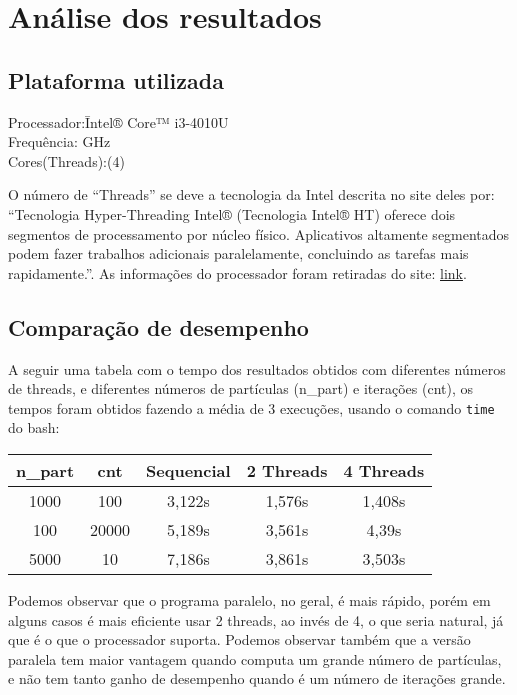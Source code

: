 \documentclass[a4paper, 12pt]{article}
\begin{document}

\section{Análise dos resultados}
\subsection{Plataforma utilizada}

\begin{tabbing}
    Processador:\qquad\qquad\=
    Intel® Core™ i3-4010U\\
    Frequência: GHz\\
    Cores(Threads):(4)
\end{tabbing}

O número de ``Threads'' se deve a tecnologia da Intel descrita no site deles
por: ``Tecnologia Hyper-Threading Intel® (Tecnologia Intel® HT) oferece dois
segmentos de processamento por núcleo físico. Aplicativos altamente segmentados
podem fazer trabalhos adicionais paralelamente, concluindo as tarefas mais
rapidamente.''. As informações do processador foram retiradas do site:
\href{http://ark.intel.com/pt-br/products/75107/Intel-Core-i3-4010U-Processor-3M-Cache-1_70-GHz}{link}.


\subsection{Comparação de desempenho}

A seguir uma tabela com o tempo dos resultados obtidos com diferentes números de
threads, e diferentes números de partículas (n\_part) e iterações (cnt), os
tempos foram obtidos fazendo a média de 3 execuções, usando o comando
\verb|time| do bash:
\begin{center}
    \begin{tabular}{ |c|c||c|c|c| }
    \hline
    n\_part & cnt & Sequencial & 2 Threads & 4 Threads \\
    \hline
    1000 & 100 & 3,122s & 1,576s & 1,408s \\
    \hline
    100 & 20000 & 5,189s & 3,561s & 4,39s \\
    \hline
    5000 & 10 & 7,186s & 3,861s & 3,503s \\
    \hline
    \end{tabular}
\end{center}
Podemos observar que o programa paralelo, no geral, é mais rápido, porém em
alguns casos é mais eficiente usar 2 threads, ao invés de 4, o que seria
natural, já que é o que o processador suporta. Podemos observar também que a
versão paralela tem maior vantagem quando computa um grande número de
partículas, e não tem tanto ganho de desempenho quando é um número de iterações
grande.
\end{document}
